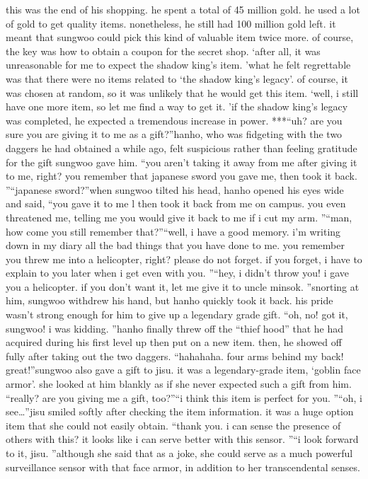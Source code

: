 this was the end of his shopping.
he spent a total of 45 million gold.
 he used a lot of gold to get quality items.
 nonetheless, he still had 100 million gold left.
it meant that sungwoo could pick this kind of valuable item twice more.
 of course, the key was how to obtain a coupon for the secret shop.
‘after all, it was unreasonable for me to expect the shadow king’s item.
’what he felt regrettable was that there were no items related to ‘the shadow king’s legacy’.
 of course, it was chosen at random, so it was unlikely that he would get this item.
‘well, i still have one more item, so let me find a way to get it.
’if the shadow king’s legacy was completed, he expected a tremendous increase in power.
***“uh? are you sure you are giving it to me as a gift?”hanho, who was fidgeting with the two daggers he had obtained a while ago, felt suspicious rather than feeling gratitude for the gift sungwoo gave him.
“you aren’t taking it away from me after giving it to me, right? you remember that japanese sword you gave me, then took it back.
”“japanese sword?”when sungwoo tilted his head, hanho opened his eyes wide and said, “you gave it to me l then took it back from me on campus.
 you even threatened me, telling me you would give it back to me if i cut my arm.
”“man, how come you still remember that?”“well, i have a good memory.
 i’m writing down in my diary all the bad things that you have done to me.
 you remember you threw me into a helicopter, right? please do not forget.
 if you forget, i have to explain to you later when i get even with you.
”“hey, i didn’t throw you! i gave you a helicopter.
 if you don’t want it, let me give it to uncle minsok.
”snorting at him, sungwoo withdrew his hand, but hanho quickly took it back.
 his pride wasn’t strong enough for him to give up a legendary grade gift.
“oh, no! got it, sungwoo! i was kidding.
”hanho finally threw off the “thief hood” that he had acquired during his first level up then put on a new item.
 then, he showed off fully after taking out the two daggers.
“hahahaha.
 four arms behind my back! great!”sungwoo also gave a gift to jisu.
 it was a legendary-grade item, ‘goblin face armor’.
she looked at him blankly as if she never expected such a gift from him.
“really? are you giving me a gift, too?”“i think this item is perfect for you.
”“oh, i see…”jisu smiled softly after checking the item information.
 it was a huge option item that she could not easily obtain.
“thank you.
 i can sense the presence of others with this? it looks like i can serve better with this sensor.
”“i look forward to it, jisu.
”although she said that as a joke, she could serve as a much powerful surveillance sensor with that face armor, in addition to her transcendental senses.
